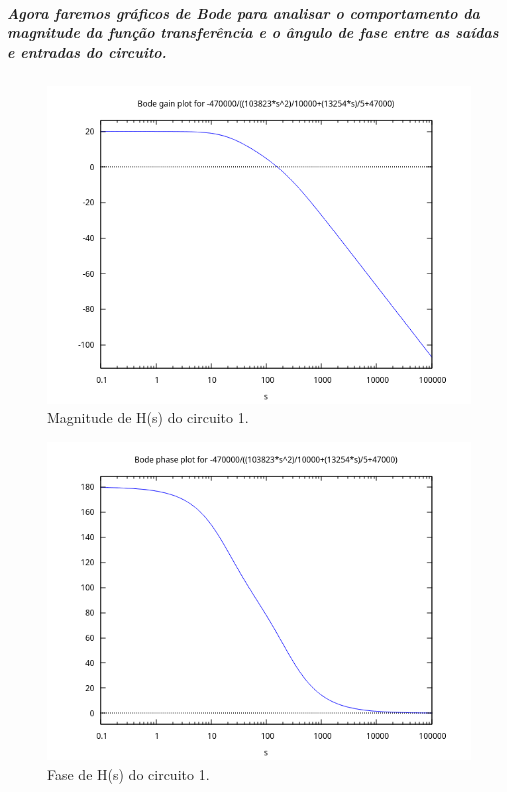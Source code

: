 \documentclass[12pt,twoside, a4paper, twocolumn]{article}
\begin{document}
\subparagraph*{Agora faremos gráficos de Bode para analisar o comportamento da magnitude da função transferência e o ângulo de fase entre as saídas e entradas do circuito.}


\subparagraph*{}


\begin{figure}[h]
    \centering
    \includegraphics[width=1\columnwidth]{images/H1bodegain.png}
    \caption{Magnitude de H(s) do circuito 1.}
\end{figure}


\begin{figure}[h]
    \centering
    \includegraphics[width=1\columnwidth]{images/H1bodephase.png}
    \caption{Fase de H(s) do circuito 1.}
\end{figure}
\end{document}
